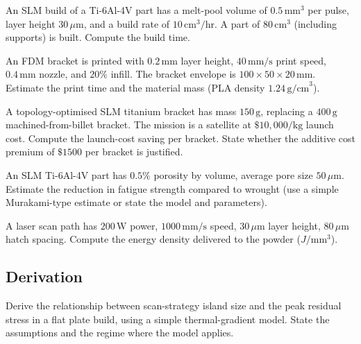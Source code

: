 \begin{exercise}
An SLM build of a Ti-6Al-4V part has a melt-pool volume of $0.5\,\text{mm}^3$ per pulse, layer height $30\,\mu\text{m}$, and a build rate of $10\,\text{cm}^3/\text{hr}$. A part of $80\,\text{cm}^3$ (including supports) is built. Compute the build time.
\end{exercise}

\begin{exercise}
An FDM bracket is printed with $0.2\,\text{mm}$ layer height, $40\,\text{mm/s}$ print speed, $0.4\,\text{mm}$ nozzle, and $20\%$ infill. The bracket envelope is $100 \times 50 \times 20\,\text{mm}$. Estimate the print time and the material mass (PLA density $1.24\,\text{g/cm}^3$).
\end{exercise}

\begin{exercise}
A topology-optimised SLM titanium bracket has mass $150\,\text{g}$, replacing a $400\,\text{g}$ machined-from-billet bracket. The mission is a satellite at $\$10{,}000/\text{kg}$ launch cost. Compute the launch-cost saving per bracket. State whether the additive cost premium of $\$1500$ per bracket is justified.
\end{exercise}

\begin{exercise}
An SLM Ti-6Al-4V part has $0.5\%$ porosity by volume, average pore size $50\,\mu\text{m}$. Estimate the reduction in fatigue strength compared to wrought (use a simple Murakami-type estimate or state the model and parameters).
\end{exercise}

\begin{exercise}
A laser scan path has $200\,\text{W}$ power, $1000\,\text{mm/s}$ speed, $30\,\mu\text{m}$ layer height, $80\,\mu\text{m}$ hatch spacing. Compute the energy density delivered to the powder ($J/\text{mm}^3$).
\end{exercise}

\subsection*{Derivation}

\begin{exercise}
Derive the relationship between scan-strategy island size and the peak residual stress in a flat plate build, using a simple thermal-gradient model. State the assumptions and the regime where the model applies.
\end{exercise}

